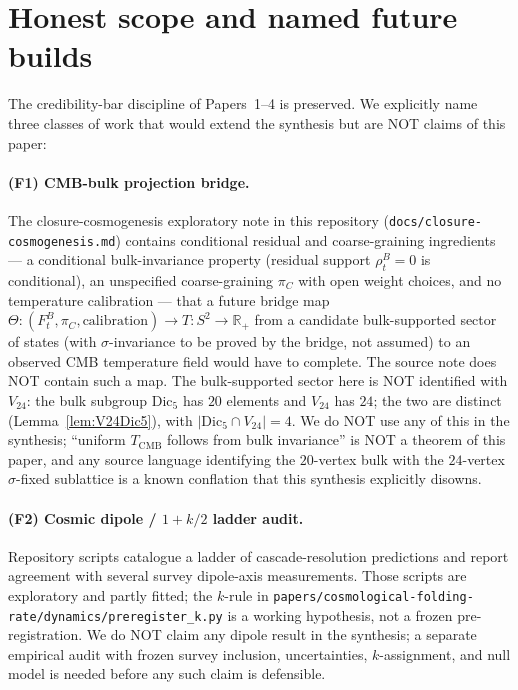\documentclass[11pt]{article}
\theoremstyle{remark}
\newcommand{\Dicfive}{\mathrm{Dic}_5}
\newcommand{\Vtwentyfour}{V_{24}}
\newcommand{\sigmaG}{\sigma}
\begin{document}
\section{Honest scope and named future builds}\label{sec:scope}

The credibility-bar discipline of Papers~1--4 is preserved. We
explicitly name three classes of work that would extend the
synthesis but are NOT claims of this paper:

\paragraph{(F1) CMB-bulk projection bridge.}
The closure-cosmogenesis exploratory note in this repository
(\texttt{docs/closure-cosmogenesis.md}) contains conditional residual
and coarse-graining ingredients --- a conditional bulk-invariance
property (residual support $\rho^B_t = 0$ is conditional), an
unspecified coarse-graining $\pi_C$ with open weight choices, and no
temperature calibration --- that a future bridge map
$\Theta : (F^B_t, \pi_C, \text{calibration}) \to T : S^2 \to \mathbb{R}_+$
from a candidate bulk-supported sector of states (with
$\sigmaG$-invariance to be proved by the bridge, not assumed) to an
observed CMB temperature field would have to complete. The source
note does NOT contain such a map. The bulk-supported sector here is
NOT identified with $\Vtwentyfour$: the bulk subgroup $\Dicfive$ has
$20$ elements and $\Vtwentyfour$ has $24$; the two are distinct
(Lemma~\ref{lem:V24Dic5}), with $|\Dicfive \cap \Vtwentyfour| = 4$.
We do NOT use any of this in the synthesis; ``uniform
$T_{\mathrm{CMB}}$ follows from bulk invariance'' is NOT a theorem
of this paper, and any source language identifying the $20$-vertex
bulk with the $24$-vertex $\sigmaG$-fixed sublattice is a known
conflation that this synthesis explicitly disowns.

\paragraph{(F2) Cosmic dipole / $1+k/2$ ladder audit.}
Repository scripts catalogue a ladder of cascade-resolution
predictions and report agreement with several survey dipole-axis
measurements. Those scripts are exploratory and partly fitted; the
$k$-rule in
\texttt{papers/cosmological-folding-rate/dynamics/preregister\_k.py}
is a working hypothesis, not a frozen pre-registration. We do NOT
claim any dipole result in the synthesis; a separate empirical
audit with frozen survey inclusion, uncertainties, $k$-assignment,
and null model is needed before any such claim is defensible.
\end{document}
